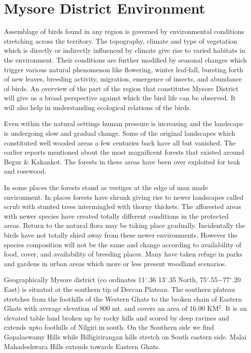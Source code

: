 \chapter{Mysore District Environment}

Assemblage of birds found in any region is governed by 
environmental conditions stretching across the territory. The 
topography, climate and type of vegetation which is directly or 
indirectly influenced by climate give rise to varied habitats in 
the environment. Their conditions are further modified by seasonal 
changes which trigger various natural phenomenon like flowering, 
winter leaf-fall, bursting forth of new leaves, breeding 
activity, migration, emergence of insects, and abundance of 
birds. An overview of the part of the region that constitutes 
Mysore District will give us a broad perspective against which 
the bird life can be observed. It will also help in understanding 
ecological relations of the birds. 

Even within the natural settings human pressure is increasing 
and the landscape is undergoing slow and gradual change. Some 
of the original landscapes which constituted well wooded areas a 
few centuries back have all but vanished. The earlier reports 
mentioned about the most magnificent forests that existed around 
Begur \& Kakankot. The forests in these areas have been over exploited 
for teak and rosewood. 

In some places the forests stand as vestiges at the edge of 
man made environment. In places forests have shrunk giving rise 
to newer landscapes called scrub with stunted trees intermingled 
with thorny thickets. The afforested areas with newer species 
have created totally different conditions in the protected areas. 
Return to the natural flora may be taking place gradually. Incidentally 
the birds have not totally shied away from these newer 
environments. However the species composition will not be the 
same and change according to availability of food, cover, and 
availability of breeding places. Many have taken refuge in parks 
and gardens in urban areas which more or less present woodland 
scenarios. 

Geographically Mysore district (co ordinates 11$^\circ$.36 13$^\circ$.35 
North, 75$^\circ$.55$-$77$^\circ$.20 East) is situated at the southern tip of 
Deccan Plateau. The southern plateau stretches from the foothills 
of the Western Ghats to the broken chain of Eastern Ghats with 
average elevation of 800 mt. and covers an area of 16.00 KM$^2$. It 
is an elevated table land broken up by rocky hills and scored by 
deep ravines and extends upto foothills of Nilgiri in south. On 
the Southern side we find Gopalaswamy Hills while Billigirirangan 
hills stretch on South eastern side. Malai Mahadeshwara Hills 
extends towards Eastern Ghats. 

